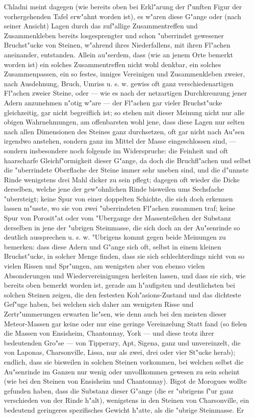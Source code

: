 \documentclass[a4paper, 11pt, oneside, german]{article}
\begin{document}
{\hspace*{6mm}Chladni meint dagegen (wie bereits oben bei Erkl"arung der f"unften Figur der vorhergehenden Tafel erw"ahnt worden ist), es w"aren diese G"ange oder (nach seiner Ansicht) Lagen durch das zuf"allige Zusammentreffen und Zusammenkleben bereits losgesprengter und schon "uberrindet gewesener Bruchst"ucke von Steinen, w"ahrend ihres Niederfallens, mit ihren Fl"achen aneinander, entstanden. Allein au"serdem, dass (wie an jenem Orte bemerkt worden ist) ein solches Zusammentreffen nicht wohl denkbar, ein solches Zusammenpassen, ein so festes, inniges Vereinigen und Zusammenkleben zweier, nach Ausdehnung, Bruch, Umriss u. s. w. gewiss oft ganz verschiedenartigen Fl"achen zweier Steine, oder --- wie es nach der netzartigen Durchkreuzung jener Adern anzunehmen n"otig w"are --- der Fl"achen gar vieler Bruchst"ucke gleichzeitig, gar nicht begreiflich ist; so stehen mit dieser Meinung nicht nur alle obigen Wahrnehmungen, am offenbarsten wohl jene, dass diese Lagen nur selten nach allen Dimensionen des Steines ganz durchsetzen, oft gar nicht nach Au"sen irgendwo anstehen, sondern ganz im Mittel der Masse eingeschlossen sind, --- sondern insbesondere noch folgende im Widerspruche: die Feinheit und oft haarscharfe Gleichf"ormigkeit dieser G"ange, da doch die Bruchfl"achen und selbst die "uberrindete Oberflache der Steine immer sehr uneben sind, und die d"unnste Rinde wenigstens drei Mahl dicker zu sein pflegt; dagegen oft wieder die Dicke derselben, welche jene der gew"ohnlichen Rinde bisweilen ums Sechsfache "ubersteigt; keine Spur von einer doppelten Schichte, die sich doch erkennen lassen m"usste, wo sie von zwei "uberrindeten Fl"achen zusammen traf; keine Spur von Porosit"at oder vom "Ubergange der Massenteilchen der Substanz derselben in jene der "ubrigen Steinmasse, die sich doch an der Au"senrinde so deutlich aussprechen u. s. w. "Ubrigens kommt gegen beide Meinungen zu bemerken: dass diese Adern und G"ange sich oft, selbst in einem kleinen Bruchst"ucke, in solcher Menge finden, dass sie sich schlechterdings nicht von so vielen Rissen und Spr"ungen, am wenigsten aber von ebenso vielen Absonderungen und Wiedervereinigungen herleiten lassen, und dass sie sich, wie bereits oben bemerkt worden ist, gerade am h"aufigsten und deutlichsten bei solchen Steinen zeigen, die den festesten Koh"asions-Zustand und das dichteste Gef"uge haben, bei welchen sich daher am wenigsten Risse und Zertr"ummerungen erwarten lie"sen, wie denn auch bei den meisten dieser Meteor-Massen gar keine oder nur eine geringe Vereinzelung Statt fand (so fielen die Massen von Ensisheim, Chantonnay, York --- und diese trotz ihrer bedeutenden Gro"se --- von Tipperary, Apt, Sigena, ganz und unvereinzelt, die von Laponas, Charsonville, Lissa, nur als zwei, drei oder vier St"ucke herab); endlich, dass sie bisweilen in solchen Steinen vorkommen, bei welchen selbst die Au"senrinde im Ganzen nur wenig oder unvollkommen gewesen zu sein scheint (wie bei den Steinen von Ensisheim und Chantonnay). Bigot de Morogues wollte gefunden haben, dass die Substanz dieser G"ange (die er "ubrigens f"ur ganz verschieden von der Rinde h"alt), wenigstens in den Steinen von Charsonville, ein bedeutend geringeres spezifisches Gewicht h"atte, als die "ubrige Steinmasse. Er }
\end{document}
